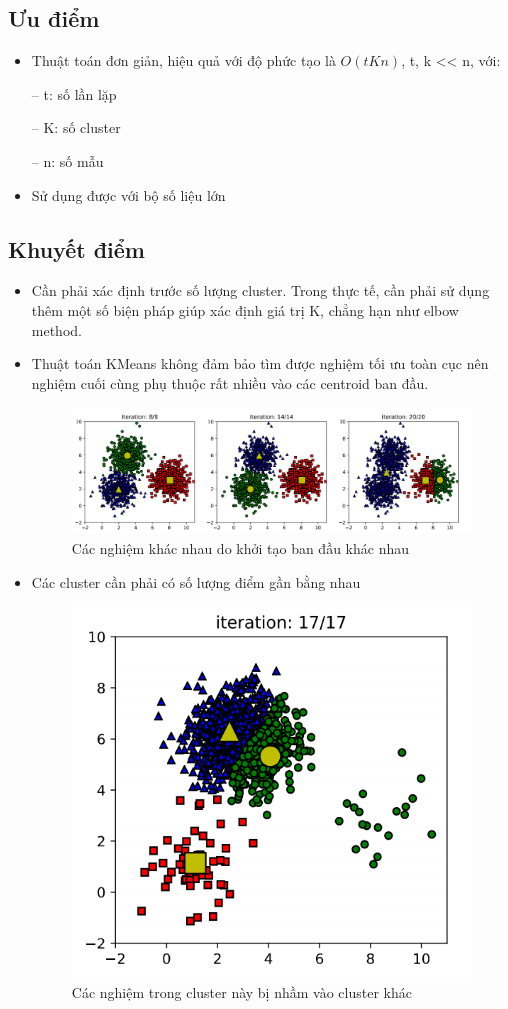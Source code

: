 \subsection{Ưu điểm}
\begin{itemize}
	\item Thuật toán đơn giản, hiệu quả với độ phức tạo là $O(tKn)$, t, k << n, với:
	\item[--]t: số lần lặp
	\item[--]K: số cluster
	\item[--]n: số mẫu
	\item Sử dụng được với bộ số liệu lớn
\end{itemize}
\subsection{Khuyết điểm}
\begin{itemize}
	\item Cần phải xác định trước số lượng cluster. Trong thực tế, cần phải sử dụng thêm một số biện pháp giúp xác định giá trị K, chẳng hạn như elbow method.
	\item Thuật toán KMeans không đảm bảo tìm được nghiệm tối ưu toàn cục nên nghiệm cuối cùng phụ thuộc rất nhiều vào các centroid ban đầu.\\
	\begin{figure}[h]
		\centering
		\includegraphics[width=0.7\linewidth]{img/disad_1}
		\caption{Các nghiệm khác nhau do khởi tạo ban đầu khác nhau}
	\end{figure}
	\item Các cluster cần phải có số lượng điểm gần bằng nhau\\
	\begin{figure}[h]
		\centering
		\includegraphics[width=0.3\linewidth]{img/disad_2}
		\caption{Các nghiệm trong cluster này bị nhầm vào cluster khác}

\end{figure}
\end{itemize}
